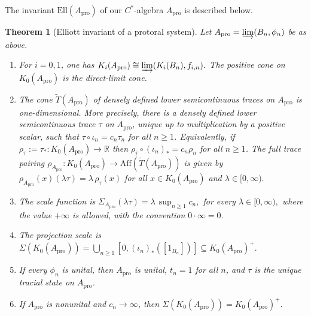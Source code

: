 \documentclass[11pt]{amsart}
\newtheorem{theorem}{Theorem}[section]
\theoremstyle{definition}
\theoremstyle{remark}
\newcommand{\Ell}{\mathrm{Ell}}
\newcommand{\Aff}{\mathrm{Aff}}
\newcommand{\ex}{\mathrm{pro}}
\begin{document}
The invariant $\Ell(A_{\ex})$ of our $C^*$-algebra $A_{\ex}$ is described below.

\begin{theorem}[Elliott invariant of a protoral system]
\label{thm:protorus-invariant}
Let $A_{\ex}=\varinjlim(B_n,\phi_n)$
be as above. 
\begin{enumerate}[label={\rm(\roman*)}]
\item For \(i=0,1\), one has $K_i(A_{\ex})\cong \varinjlim(K_i(B_n),f_{i,n}).$ The positive cone on \(K_0(A_{\ex})\) is the direct-limit cone.

\item The cone \(\widetilde T(A_{\ex})\) of densely defined lower semicontinuous
traces on \(A_{\ex}\) is one-dimensional. More precisely, there is a densely
defined lower semicontinuous trace \(\tau\) on \(A_{\ex}\), unique up to
multiplication by a positive scalar, such that $\tau\circ\iota_n=c_n\tau_n$
for all $n\geq 1$.
Equivalently, if $\rho_\tau:=\tau_*\colon K_0(A_{\ex})\to\mathbb R$
then $\rho_\tau\circ(\iota_n)_*=c_n\rho_n$ for all $n\geq 1$.
The full trace pairing $\rho_{A_{\ex}}\colon K_0(A_{\ex})\to \Aff(\widetilde T(A_{\ex}))$
is given by $\rho_{A_{\ex}}(x)(\lambda\tau)=\lambda\,\rho_\tau(x)$ for all
$x\in K_0(A_{\ex})$ and $\lambda\in[0,\infty).$

\item The scale function is $\Sigma_{A_{\ex}}(\lambda\tau)
=
\lambda\,\sup_{n\geq 1}c_n,$ for every $
\lambda\in[0,\infty),$
where the value \(+\infty\) is allowed, with the convention $0\cdot\infty=0$.

\item The projection scale is $\Sigma(K_0(A_{\ex}))
=
\bigcup_{n\geq 1}
[0,(\iota_n)_*([1_{B_n}])]
\subseteq K_0(A_{\ex})^+.$

\item If every $\phi_n$ is unital, then $A_{\ex}$ is unital,
$t_n=1$ for all $n$, and $\tau$ is the unique tracial state on
$A_{\ex}$.

\item If \(A_{\ex}\) is nonunital and \(c_n\to\infty\), then $\Sigma(K_0(A_{\ex}))=K_0(A_{\ex})^+.$
\end{enumerate}
\end{theorem}
\end{document}
